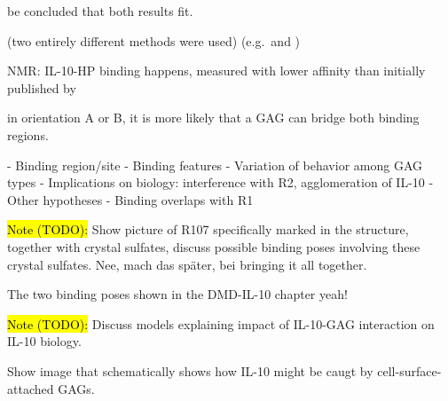 be concluded that both results fit.


 (two entirely different methods were used) (e.g.\ and )



NMR: IL-10-HP binding happens, measured with lower affinity than initially published by


in orientation A or B, it is more likely that a GAG can bridge both binding
regions.



    - Binding region/site
    - Binding features
    - Variation of behavior among GAG types
    - Implications on biology: interference with R2, agglomeration of IL-10
    - Other hypotheses
        - Binding overlaps with R1


\hl{Note (TODO):}
Show picture of R107 specifically marked in the structure, together with
crystal sulfates, discuss possible binding poses involving these crystal
sulfates. Nee, mach das später, bei bringing it all together.

The two binding poses shown in the DMD-IL-10 chapter yeah!


\hl{Note (TODO):}
Discuss models explaining impact of IL-10-GAG interaction on IL-10 biology.

Show image that schematically shows how IL-10 might be caugt by cell-surface-attached GAGs.

